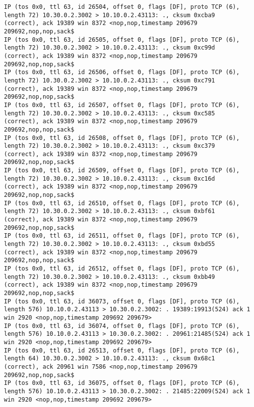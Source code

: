 \documentclass[a4paper,12pt]{article}
\begin{document}
\begin{lstlisting}
IP (tos 0x0, ttl 63, id 26504, offset 0, flags [DF], proto TCP (6), length 72) 10.30.0.2.3002 > 10.10.0.2.43113: ., cksum 0xcba9 (correct), ack 19389 win 8372 <nop,nop,timestamp 209679 209692,nop,nop,sack$
IP (tos 0x0, ttl 63, id 26505, offset 0, flags [DF], proto TCP (6), length 72) 10.30.0.2.3002 > 10.10.0.2.43113: ., cksum 0xc99d (correct), ack 19389 win 8372 <nop,nop,timestamp 209679 209692,nop,nop,sack$
IP (tos 0x0, ttl 63, id 26506, offset 0, flags [DF], proto TCP (6), length 72) 10.30.0.2.3002 > 10.10.0.2.43113: ., cksum 0xc791 (correct), ack 19389 win 8372 <nop,nop,timestamp 209679 209692,nop,nop,sack$
IP (tos 0x0, ttl 63, id 26507, offset 0, flags [DF], proto TCP (6), length 72) 10.30.0.2.3002 > 10.10.0.2.43113: ., cksum 0xc585 (correct), ack 19389 win 8372 <nop,nop,timestamp 209679 209692,nop,nop,sack$
IP (tos 0x0, ttl 63, id 26508, offset 0, flags [DF], proto TCP (6), length 72) 10.30.0.2.3002 > 10.10.0.2.43113: ., cksum 0xc379 (correct), ack 19389 win 8372 <nop,nop,timestamp 209679 209692,nop,nop,sack$
IP (tos 0x0, ttl 63, id 26509, offset 0, flags [DF], proto TCP (6), length 72) 10.30.0.2.3002 > 10.10.0.2.43113: ., cksum 0xc16d (correct), ack 19389 win 8372 <nop,nop,timestamp 209679 209692,nop,nop,sack$
IP (tos 0x0, ttl 63, id 26510, offset 0, flags [DF], proto TCP (6), length 72) 10.30.0.2.3002 > 10.10.0.2.43113: ., cksum 0xbf61 (correct), ack 19389 win 8372 <nop,nop,timestamp 209679 209692,nop,nop,sack$
IP (tos 0x0, ttl 63, id 26511, offset 0, flags [DF], proto TCP (6), length 72) 10.30.0.2.3002 > 10.10.0.2.43113: ., cksum 0xbd55 (correct), ack 19389 win 8372 <nop,nop,timestamp 209679 209692,nop,nop,sack$
IP (tos 0x0, ttl 63, id 26512, offset 0, flags [DF], proto TCP (6), length 72) 10.30.0.2.3002 > 10.10.0.2.43113: ., cksum 0xbb49 (correct), ack 19389 win 8372 <nop,nop,timestamp 209679 209692,nop,nop,sack$
IP (tos 0x0, ttl 63, id 36073, offset 0, flags [DF], proto TCP (6), length 576) 10.10.0.2.43113 > 10.30.0.2.3002: . 19389:19913(524) ack 1 win 2920 <nop,nop,timestamp 209692 209679>
IP (tos 0x0, ttl 63, id 36074, offset 0, flags [DF], proto TCP (6), length 576) 10.10.0.2.43113 > 10.30.0.2.3002: . 20961:21485(524) ack 1 win 2920 <nop,nop,timestamp 209692 209679>
IP (tos 0x0, ttl 63, id 26513, offset 0, flags [DF], proto TCP (6), length 64) 10.30.0.2.3002 > 10.10.0.2.43113: ., cksum 0x68c1 (correct), ack 20961 win 7586 <nop,nop,timestamp 209679 209692,nop,nop,sack$
IP (tos 0x0, ttl 63, id 36075, offset 0, flags [DF], proto TCP (6), length 576) 10.10.0.2.43113 > 10.30.0.2.3002: . 21485:22009(524) ack 1 win 2920 <nop,nop,timestamp 209692 209679>

\end{lstlisting}
\end{document}
